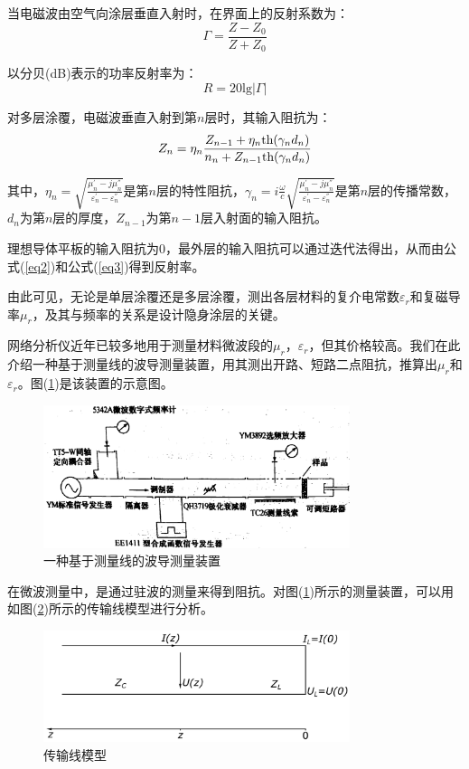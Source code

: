 \documentclass[a4paper]{article}
\begin{document}
当电磁波由空气向涂层垂直入射时，在界面上的反射系数为：
\begin{equation}
	\Gamma=\frac{Z-Z_0}{Z+Z_0}\label{eq2}
\end{equation}

以分贝(dB)表示的功率反射率为：
\begin{equation}
	R=20\text{lg}|\Gamma|\label{eq3}
\end{equation}

对多层涂覆，电磁波垂直入射到第$n$层时，其输入阻抗为：
\begin{equation}
	Z_n=\eta_n\frac{Z_{n-1}+\eta_n\text{th}(\gamma_nd_n)}{n_n+Z_{n-1}\text{th}(\gamma_nd_n)}\label{eq4}
\end{equation}

其中，$\eta_n = \sqrt{\frac{\mu_n^{'} - j\mu_n^{''}}{\varepsilon_n^{'} - \varepsilon_n^{''}}}$是第$n$层的特性阻抗，$\gamma_n = i\frac{\omega}{c}\sqrt{\frac{\mu_n^{'} - j\mu_n^{''}}{\varepsilon_n^{'} - \varepsilon_n^{''}}}$是第$n$层的传播常数，$d_n$为第$n$层的厚度，$Z_{n-1}$为第$n-1$层入射面的输入阻抗。

理想导体平板的输入阻抗为0，最外层的输入阻抗可以通过迭代法得出，从而由公式(\ref{eq2})和公式(\ref{eq3})得到反射率。

由此可见，无论是单层涂覆还是多层涂覆，测出各层材料的复介电常数$\varepsilon_r$和复磁导率$\mu_r$，及其与频率的关系是设计隐身涂层的关键。

网络分析仪近年已较多地用于测量材料微波段的$\mu_r$，$\varepsilon_r$，但其价格较高。我们在此介绍一种基于测量线的波导测量装置，用其测出开路、短路二点阻抗，推算出$\mu_r$和$\varepsilon_r$。图(\ref{fig1})是该装置的示意图。
\begin{figure}[!h]
	\centering
	\includegraphics[width=0.8\textwidth]{fig/fig1.png}
	\caption{一种基于测量线的波导测量装置}\label{fig1}
\end{figure}

在微波测量中，是通过驻波的测量来得到阻抗。对图(\ref{fig1})所示的测量装置，可以用如图(\ref{fig2})所示的传输线模型进行分析。
\begin{figure}[!h]
	\centering
	\includegraphics[width=0.8\textwidth]{fig/fig2.pdf}
	\caption{传输线模型}\label{fig2}
\end{figure}
\end{document}
